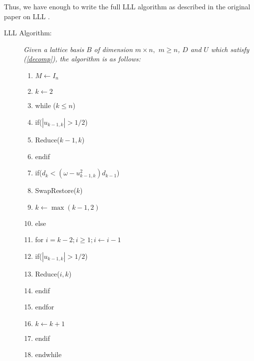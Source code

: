 \documentclass[12pt]{article}
\numberwithin{equation}{section}
\numberwithin{table}{section}
\numberwithin{figure}{section}
\begin{document}
Thus, we have enough to write the full LLL algorithm as described in the original paper on LLL \cite{OriginalLLL}.
\pagebreak
\begin{description}
\item[LLL Algorithm:] \textit{Given a lattice basis $B$ of dimension $m\times n,$ $m\geq n$, $D$ and $U$ which satisfy (\ref{decomp}), the algorithm is as follows:}
\begin{enumerate}[1\hspace{.75em}]
\item $M\leftarrow I_n$
\item $k\leftarrow 2$
\item while ($k\leq n$)
\item \hspace{2em} if($|u_{k-1,k}|>1/2$)
\item \hspace{2em}\hspace{2em} Reduce($k-1,k$)
\item \hspace{2em} endif
\item \hspace{2em} if($d_k<\left(\omega -u^2_{k-1,k}\right)d_{k-1}$)
\item \hspace{2em}\hspace{2em} SwapRestore($k$)
\item \hspace{2em}\hspace{2em} $k\leftarrow\max(k-1,2)$
\item \hspace{2em} else
\item \hspace{2em}\hspace{2em} for $i=k-2; i \geq 1; i\leftarrow i-1$
\item \hspace{2em}\hspace{2em} \hspace{2em} if($|u_{k-1,k}|>1/2$)
\item \hspace{2em}\hspace{2em} \hspace{2em} \hspace{2em} Reduce($i,k$)
\item \hspace{2em}\hspace{2em} \hspace{2em} endif
\item \hspace{2em}\hspace{2em} endfor
\item \hspace{2em} $k\leftarrow k+1$
\item \hspace{2em} endif
\item endwhile
\end{enumerate}
\end{description}
\end{document}
